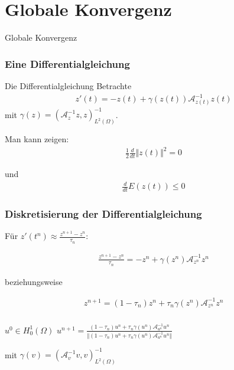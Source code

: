 \documentclass{beamer}
\newcommand{\sectionstart}[1]{
    \section{#1}
    \begin{frame}
        \centering
        \huge{#1}
    \end{frame}
}
\newcommand{\Ltwo}{\ensuremath{{L^2(\Omega)}}}
\newcommand{\Honez}{\ensuremath{{H^1_0(\Omega)}}}
\newcommand{\mA}{\ensuremath{\mathcal{A}}}
\begin{document}
    \sectionstart{Globale Konvergenz}

    \begin{frame}
        \frametitle{Eine Differentialgleichung}

        \begin{block}{Die Differentialgleichung}
            Betrachte
            \begin{align*}
                z'(t) = -z(t) + \gamma(z(t))\mA_{z(t)}^{-1}z(t)
            \end{align*}
            mit $\gamma(z) = (\mA_z^{-1} z, z)_\Ltwo^{-1}$.
        \end{block}

        \pause
        \medskip

        Man kann zeigen:
        \begin{align*}
            \frac{1}{2}\frac{d}{dt}\Vert z(t) \Vert^2 = 0
        \end{align*}

        \pause
        \medskip

        und
        \begin{align*}
            \frac{d}{dt}E(z(t)) \leq 0
        \end{align*}
    \end{frame}

    \begin{frame}
        \frametitle{Diskretisierung der Differentialgleichung}

        Für $z'(t^n) \approx \frac{z^{n+1} - z^{n}}{\tau_n}$:

        \pause

        \begin{align*}
            \frac{z^{n+1} - z^{n}}{\tau_n} = -z^n + \gamma(z^n)\mA_{z^n}^{-1}z^n
        \end{align*}

        \pause

        beziehungsweise

        \begin{align*}
            z^{n+1} = (1 - \tau_n)z^n + \tau_n \gamma(z^n) \mA_{z^n}^{-1}z^n
        \end{align*}
    \end{frame}

    \begin{frame}
        \frametitle{\insertsection}
        \begin{algorithm}[H]
            \caption{Gedämpfte Inverse Iteration}
            \begin{algorithmic}[1]
                \STATE $u^0 \in \Honez$
                \STATE $u^{n+1} = \frac
                {(1-\tau_n)u^n + \tau_n\gamma(u^n)\mA_{u^n}^{-1} u^n}
                {\Vert(1-\tau_n)u^n + \tau_n\gamma(u^n)\mA_{u^n}^{-1} u^n\Vert}$
                \ENDFOR
            \end{algorithmic}
        \end{algorithm}
        \bigskip

        mit $\gamma(v) = (\mA_v^{-1} v, v)_\Ltwo^{-1}$
    \end{frame}
\end{document}
